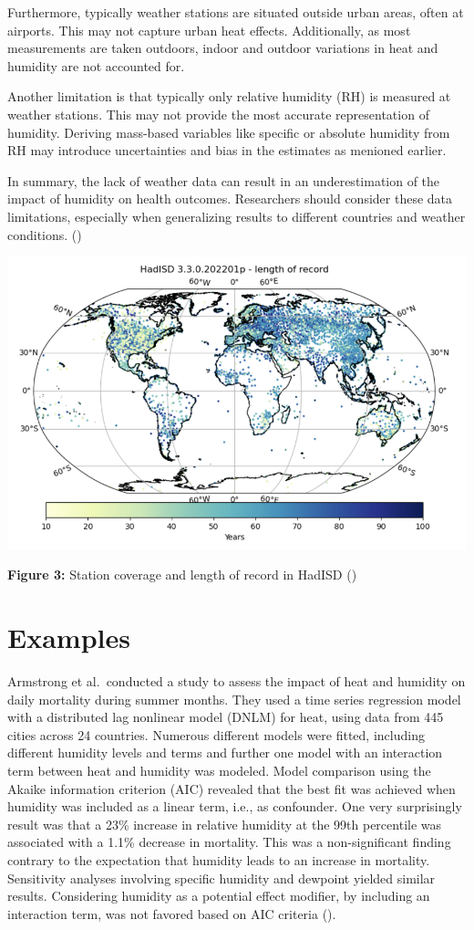 \documentclass[
]{krantz}
\begin{document}
Furthermore, typically weather stations are situated outside urban areas, often at airports. This may not capture urban heat effects. Additionally, as most measurements are taken outdoors, indoor and outdoor variations in heat and humidity are not accounted for.

Another limitation is that typically only relative humidity (RH) is measured at weather stations. This may not provide the most accurate representation of humidity. Deriving mass-based variables like specific or absolute humidity from RH may introduce uncertainties and bias in the estimates as menioned earlier.

In summary, the lack of weather data can result in an underestimation of the impact of humidity on health outcomes. Researchers should consider these data limitations, especially when generalizing results to different countries and weather conditions. (\citet{bald})

\begin{center}\includegraphics[width=0.8\linewidth]{hadisdimage1} \end{center}

\textbf{Figure 3:} Station coverage and length of record in HadISD (\citet{raymond})

\section{Examples}\label{examples}

Armstrong et al.~conducted a study to assess the impact of heat and humidity on daily mortality during summer months. They used a time series regression model with a distributed lag nonlinear model (DNLM) for heat, using data from 445 cities across 24 countries. Numerous different models were fitted, including different humidity levels and terms and further one model with an interaction term between heat and humidity was modeled. Model comparison using the Akaike information criterion (AIC) revealed that the best fit was achieved when humidity was included as a linear term, i.e., as confounder. One very surprisingly result was that a 23\% increase in relative humidity at the 99th percentile was associated with a 1.1\% decrease in mortality. This was a non-significant finding contrary to the expectation that humidity leads to an increase in mortality. Sensitivity analyses involving specific humidity and dewpoint yielded similar results. Considering humidity as a potential effect modifier, by including an interaction term, was not favored based on AIC criteria (\citet{armstrong}).
\end{document}
